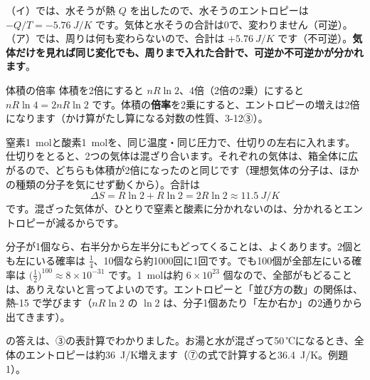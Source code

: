 （イ）では、水そうが熱 $Q$ を出したので、水そうのエントロピーは $-Q/T=\qty{-5.76}{J/K}$ です。気体と水そうの合計は0で、変わりません（可逆）。（ア）では、周りは何も変わらないので、合計は $+\qty{5.76}{J/K}$ です（不可逆）。\textbf{気体だけを見れば同じ変化でも、周りまで入れた合計で、可逆か不可逆かが分かれます}。

\begin{phbaisuru}[2乗]{体積の倍率}
体積を2倍にすると $nR\ln2$、4倍（2倍の2乗）にすると $nR\ln4=2nR\ln2$ です。体積の\textbf{倍率}を2乗にすると、エントロピーの増えは2倍になります（かけ算がたし算になる対数の性質、3-12③）。
\end{phbaisuru}

窒素\qty{1}{mol}と酸素\qty{1}{mol}を、同じ温度・同じ圧力で、仕切りの左右に入れます。仕切りをとると、2つの気体は混ざり合います。それぞれの気体は、箱全体に広がるので、どちらも体積が2倍になったのと同じです（理想気体の分子は、ほかの種類の分子を気にせず動くから）。合計は
\[\Delta S=R\ln2+R\ln2=2R\ln2\approx\qty{11.5}{J/K}\]
です。混ざった気体が、ひとりで窒素と酸素に分かれないのは、分かれるとエントロピーが減るからです。

\begin{phmijika}[分子の数で考えると]
分子が1個なら、右半分から左半分にもどってくることは、よくあります。2個とも左にいる確率は $\tfrac14$、10個なら約1000回に1回です。でも100個が全部左にいる確率は $\bigl(\tfrac12\bigr)^{100}\approx8\times10^{-31}$ です。\qty{1}{mol}は約 $6\times10^{23}$ 個なので、全部がもどることは、ありえないと言ってよいのです。エントロピーと「並び方の数」の関係は、熱-15 で学びます（$nR\ln2$ の $\ln2$ は、分子1個あたり「左か右か」の2通りから出てきます）。
\end{phmijika}

\label{ph:熱-6:sec5}
\begin{phmodel}[お湯と水を混ぜる]
\end{phmodel}

\bkhatenaref の答えは、③の表計算でわかりました。お湯と水が混ざって50\,℃になるとき、全体のエントロピーは約\qty{36}{J/K}増えます（⑦の式で計算すると\qty{36.4}{J/K}。例題1）。

